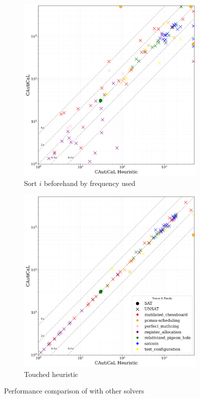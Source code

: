 \begin{figure}[!t]
\begin{subfigure}[t]{0.3\textwidth}
        \includegraphics[width=\textwidth]{figs/globalisort_heuristic_comparison.jpg}
        \caption{Sort $i$ beforehand by frequency used}
        \label{fig:cautical-vs-prelearn}
    \end{subfigure}
    \begin{subfigure}[t]{0.3\textwidth}
        \centering
        \includegraphics[width=\textwidth]{figs/globaltouch_heuristic_comparison.jpg}
        \caption{Touched heuristic}
        \label{fig:cautical-vs-prelearn}
    \end{subfigure}

    \caption{Performance comparison of \tool with other solvers}
\end{figure}


